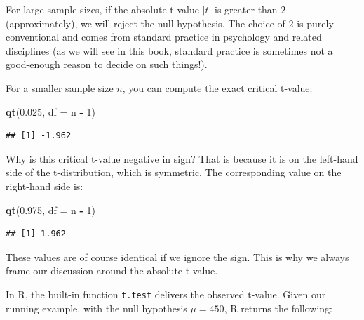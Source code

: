 \documentclass[12pt,]{krantz}
\newenvironment{Shaded}{\begin{snugshade}}{\end{snugshade}}
\newcommand{\CommentTok}[1]{\textcolor[rgb]{0.56,0.35,0.01}{\textit{#1}}}
\newcommand{\DataTypeTok}[1]{\textcolor[rgb]{0.13,0.29,0.53}{#1}}
\newcommand{\DecValTok}[1]{\textcolor[rgb]{0.00,0.00,0.81}{#1}}
\newcommand{\FloatTok}[1]{\textcolor[rgb]{0.00,0.00,0.81}{#1}}
\newcommand{\KeywordTok}[1]{\textcolor[rgb]{0.13,0.29,0.53}{\textbf{#1}}}
\newcommand{\NormalTok}[1]{#1}
\newcommand{\OperatorTok}[1]{\textcolor[rgb]{0.81,0.36,0.00}{\textbf{#1}}}
\newcommand{\StringTok}[1]{\textcolor[rgb]{0.31,0.60,0.02}{#1}}
\begin{document}
For large sample sizes, if the absolute t-value \(|t|\) is greater than \(2\) (approximately), we will reject the null hypothesis. The choice of \(2\) is purely conventional and comes from standard practice in psychology and related disciplines (as we will see in this book, standard practice is sometimes not a good-enough reason to decide on such things!).

For a smaller sample size \(n\), you can compute the exact critical t-value:

\begin{Shaded}
\begin{Highlighting}[]
\KeywordTok{qt}\NormalTok{(}\FloatTok{0.025}\NormalTok{, }\DataTypeTok{df =}\NormalTok{ n }\OperatorTok{-}\StringTok{ }\DecValTok{1}\NormalTok{)}
\end{Highlighting}
\end{Shaded}

\begin{verbatim}
## [1] -1.962
\end{verbatim}

Why is this critical t-value negative in sign? That is because it is on the left-hand side of the t-distribution, which is symmetric.
The corresponding value on the right-hand side is:

\begin{Shaded}
\begin{Highlighting}[]
\KeywordTok{qt}\NormalTok{(}\FloatTok{0.975}\NormalTok{, }\DataTypeTok{df =}\NormalTok{ n }\OperatorTok{-}\StringTok{ }\DecValTok{1}\NormalTok{)}
\end{Highlighting}
\end{Shaded}

\begin{verbatim}
## [1] 1.962
\end{verbatim}

These values are of course identical if we ignore the sign. This is why we always frame our discussion around the absolute t-value.

In R, the built-in function \texttt{t.test} delivers the observed t-value. Given our running example, with the null hypothesis \(\mu=450\), R returns the following:

\begin{Shaded}
\end{Shaded}
\end{document}
